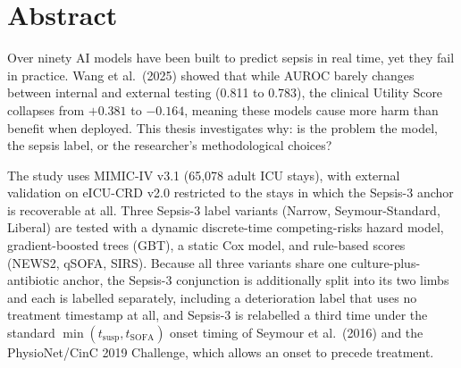\chapter*{Abstract}

Over ninety AI models have been built to predict sepsis in real time, yet they
fail in practice. Wang et al.\ (2025) showed that while AUROC barely changes
between internal and external testing (0.811 to 0.783), the clinical Utility
Score collapses from $+0.381$ to $-0.164$, meaning these models cause more
harm than benefit when deployed. This thesis investigates why: is the problem
the model, the sepsis label, or the researcher's methodological choices?

The study uses MIMIC-IV v3.1 (65,078 adult ICU stays), with external validation
on eICU-CRD v2.0 restricted to the stays in which the Sepsis-3 anchor is
recoverable at all. Three
Sepsis-3 label variants (Narrow, Seymour-Standard, Liberal) are tested with a
dynamic discrete-time competing-risks hazard model, gradient-boosted trees (GBT),
a static Cox model, and rule-based scores (NEWS2, qSOFA, SIRS). Because all
three variants share one culture-plus-antibiotic anchor, the Sepsis-3
conjunction is additionally split into its two limbs and each is labelled
separately, including a deterioration label that uses no treatment timestamp at
all, and Sepsis-3 is relabelled a third time under the standard
$\min(t_{\text{susp}}, t_{\text{SOFA}})$ onset timing of Seymour et al.\ (2016)
and the PhysioNet/CinC 2019 Challenge, which allows an onset to precede
treatment.

